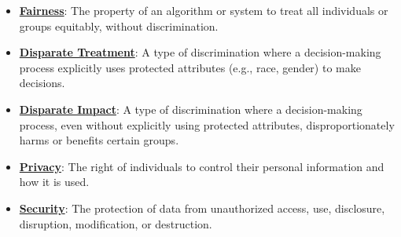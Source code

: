 \documentclass{article}%
\begin{document}
\begin{itemize}[leftmargin=*]%
\item \href{https://purdue.brightspace.com/d2l/common/assets/pdfjs-d2l-dist/1.0.14-legacy/web/viewer.html?file=\%2Fcontent\%2Fenforced\%2F1095467-wl.202510.CS.24300.001\%2F16L2-ethics.pdf\%3Fou\%3D1095467\&lang=en-us\&container=d2l-fileviewer-rendered-pdf\&fullscreen=d2l-fileviewer-rendered-pdf-dialog\&height=667#page=2}{\textbf{Fairness}}: The property of an algorithm or system to treat all individuals or groups equitably, without discrimination.%
\item \href{https://purdue.brightspace.com/d2l/common/assets/pdfjs-d2l-dist/1.0.14-legacy/web/viewer.html?file=\%2Fcontent\%2Fenforced\%2F1095467-wl.202510.CS.24300.001\%2F16L2-ethics.pdf\%3Fou\%3D1095467\&lang=en-us\&container=d2l-fileviewer-rendered-pdf\&fullscreen=d2l-fileviewer-rendered-pdf-dialog\&height=667#page=19}{\textbf{Disparate Treatment}}: A type of discrimination where a decision-making process explicitly uses protected attributes (e.g., race, gender) to make decisions.%
\item \href{https://purdue.brightspace.com/d2l/common/assets/pdfjs-d2l-dist/1.0.14-legacy/web/viewer.html?file=\%2Fcontent\%2Fenforced\%2F1095467-wl.202510.CS.24300.001\%2F16L2-ethics.pdf\%3Fou\%3D1095467\&lang=en-us\&container=d2l-fileviewer-rendered-pdf\&fullscreen=d2l-fileviewer-rendered-pdf-dialog\&height=667#page=19}{\textbf{Disparate Impact}}: A type of discrimination where a decision-making process, even without explicitly using protected attributes, disproportionately harms or benefits certain groups.%
\item \href{https://purdue.brightspace.com/d2l/common/assets/pdfjs-d2l-dist/1.0.14-legacy/web/viewer.html?file=\%2Fcontent\%2Fenforced\%2F1095467-wl.202510.CS.24300.001\%2F16L2-ethics.pdf\%3Fou\%3D1095467\&lang=en-us\&container=d2l-fileviewer-rendered-pdf\&fullscreen=d2l-fileviewer-rendered-pdf-dialog\&height=667#page=9}{\textbf{Privacy}}: The right of individuals to control their personal information and how it is used.%
\item \href{https://purdue.brightspace.com/d2l/common/assets/pdfjs-d2l-dist/1.0.14-legacy/web/viewer.html?file=\%2Fcontent\%2Fenforced\%2F1095467-wl.202510.CS.24300.001\%2F16L2-ethics.pdf\%3Fou\%3D1095467\&lang=en-us\&container=d2l-fileviewer-rendered-pdf\&fullscreen=d2l-fileviewer-rendered-pdf-dialog\&height=667#page=11}{\textbf{Security}}: The protection of data from unauthorized access, use, disclosure, disruption, modification, or destruction.%

\end{itemize}
\end{document}
